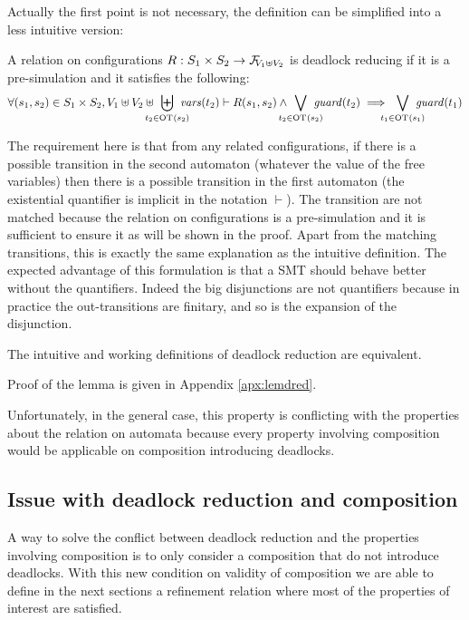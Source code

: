 \documentclass{article}
\begin{document}
Actually the first point is not necessary, the definition can be simplified into a less intuitive version:
\begin{defi}\label{def:dpwd}
A relation on configurations \(R: S_1 \times S_2 \to \rformulas[V_1 \uplus V_2]\) is deadlock reducing if it is a pre-simulation and it satisfies the following:
\[ \forall \mpar{s_1, s_2} \in S_1 \times S_2, V_1 \uplus V_2 \uplus \biguplus_\subbox{t_2 \in \fOT{s_2}} \fvars{t_2} \vdash R\mpar{s_1, s_2} \wedge \bigvee_\subbox{t_2 \in \fOT{s_2}} \fguard{t_2} \implies \bigvee_\subbox{t_1 \in \fOT{s_1}} \fguard{t_1} \]
\end{defi}
The requirement here is that from any related configurations, if there is a possible transition in the second automaton (whatever the value of the free variables) then there is a possible transition in the first automaton (the existential quantifier is implicit in the notation \(\vdash\)).
The transition are not matched because the relation on configurations is a pre-simulation and it is sufficient to ensure it as will be shown in the proof.
Apart from the matching transitions, this is exactly the same explanation as the intuitive definition.
The expected advantage of this formulation is that a SMT should behave better without the quantifiers.
Indeed the big disjunctions are not quantifiers because in practice the out-transitions are finitary, and so is the expansion of the disjunction.
\begin{lem}\label{lem:dred}
The intuitive and working definitions of deadlock reduction are equivalent.
\end{lem}
Proof of the lemma is given in Appendix \ref{apx:lemdred}.

Unfortunately, in the general case, this property is conflicting with the properties about the relation on automata because every property involving composition would be applicable on composition introducing deadlocks.

\subsection{Issue with deadlock reduction and composition}
A way to solve the conflict between deadlock reduction and the properties involving composition is to only consider a composition that do not introduce deadlocks.
With this new condition on validity of composition we are able to define in the next sections a refinement relation where most of the properties of interest are satisfied.
\end{document}
